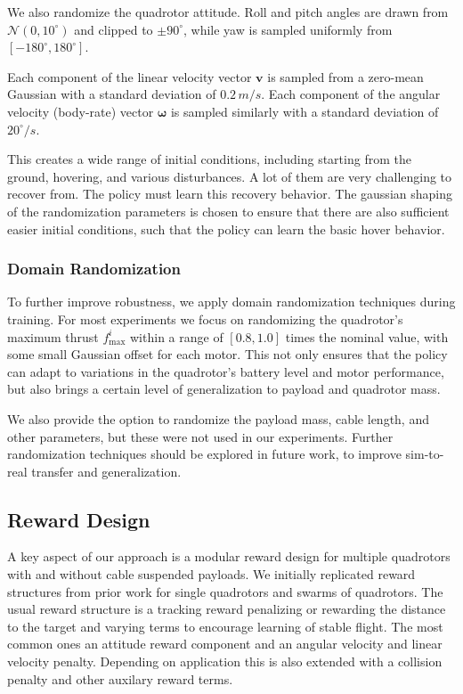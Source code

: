 We also randomize the quadrotor attitude. Roll and pitch angles are drawn from $\mathcal{N}(0,10^\circ)$ and clipped to $\pm90^\circ$, while yaw is sampled uniformly from $[-180^\circ,180^\circ]$.

Each component of the linear velocity vector $\mathbf{v}$ is sampled from a zero-mean Gaussian with a standard deviation of $0.2\,m/s$. Each component of the angular velocity (body-rate) vector $\boldsymbol{\omega}$ is sampled similarly with a standard deviation of $20^\circ/s$.

This creates a wide range of initial conditions, including starting from the ground, hovering, and various disturbances. A lot of them are very challenging to recover from. The policy must learn this recovery behavior. The gaussian shaping of the randomization parameters is chosen to ensure that there are also sufficient easier initial conditions, such that the policy can learn the basic hover behavior.
\subsubsection{Domain Randomization}
To further improve robustness, we apply domain randomization techniques during training. For most experiments we focus on randomizing the quadrotor's maximum thrust $f_{\max}^i$ within a range of $[0.8,1.0]$ times the nominal value, with some small Gaussian offset for each motor. This not only ensures that the policy can adapt to variations in the quadrotor's  battery level and motor performance, but also brings a certain level of generalization to payload and quadrotor mass.

We also provide the option to randomize the payload mass, cable length, and other parameters, but these were not used in our experiments. Further randomization techniques should be explored in future work, to improve sim-to-real transfer and generalization.




\subsection{Reward Design}
A key aspect of our approach is a modular reward design for multiple quadrotors with and without cable suspended payloads.
We initially replicated reward structures from prior work for single quadrotors and swarms of quadrotors. The usual reward structure is a tracking reward penalizing or rewarding the distance to the target and varying terms to encourage learning of stable flight. The most common ones an attitude reward component and an angular velocity and linear velocity penalty. Depending on application this is also extended with a collision penalty and other auxilary reward terms. \cite{molchanov_sim--multi-real_2019,eschmann_learning_2024-1,kaufmann_benchmark_2022, huang_collision_2024}

